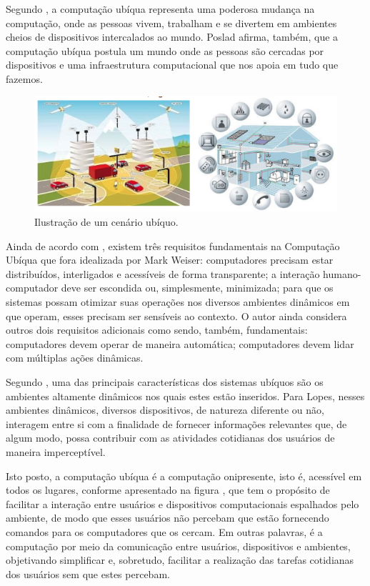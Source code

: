 Segundo \cite{poslad2009}, a computação ubíqua representa uma poderosa mudança na computação, onde as pessoas vivem, trabalham e se divertem em ambientes cheios de dispositivos intercalados ao mundo. Poslad afirma, também, que a computação ubíqua postula um mundo onde as pessoas são cercadas por dispositivos e uma infraestrutura computacional que nos apoia em tudo que fazemos. 

\begin{figure}[htp]
\begin{center}
  \includegraphics[width=14cm]{images/cenario_ubiquo.png}
  \caption[Ilustração de um cenário ubíquo]{Ilustração de um cenário ubíquo.}
  \label{fig:exampleFigCenarioUbiquo}
\end{center}
\end{figure}

Ainda de acordo com \cite{poslad2009}, existem três requisitos fundamentais na Computação Ubíqua que fora idealizada por Mark Weiser: computadores precisam estar distribuídos, interligados e acessíveis de forma transparente; a interação humano-computador deve ser escondida ou, simplesmente, minimizada; para que os sistemas possam otimizar suas operações nos diversos ambientes dinâmicos em que operam, esses precisam ser sensíveis ao contexto.  O autor ainda considera outros dois requisitos adicionais como sendo, também, fundamentais: computadores devem operar de maneira automática; computadores devem lidar com  múltiplas ações dinâmicas. 
	
Segundo \cite{lopes2011}, uma das principais características dos sistemas ubíquos são os ambientes altamente dinâmicos  nos quais estes estão inseridos. Para Lopes, nesses ambientes dinâmicos, diversos dispositivos, de natureza diferente ou não, interagem entre si com a finalidade de fornecer informações relevantes que, de algum modo, possa contribuir com as atividades cotidianas dos usuários de maneira imperceptível.
	
Isto posto, a computação ubíqua é a computação onipresente, isto é, acessível em todos os lugares, conforme apresentado na figura , que tem o propósito de facilitar a interação entre usuários e dispositivos computacionais espalhados pelo ambiente, de modo que esses usuários não percebam que estão fornecendo comandos para os computadores que os cercam.  Em outras palavras, é a computação por meio da comunicação entre usuários, dispositivos e ambientes, objetivando simplificar e, sobretudo, facilitar a realização das tarefas cotidianas dos usuários sem que estes percebam.


